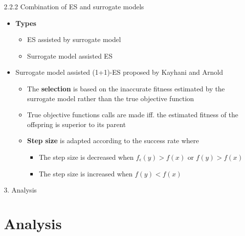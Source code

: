 \documentclass{beamer}
\begin{document}
\begin{frame}{2.2.2 Combination of ES and surrogate models}

\begin{itemize}
    \item \textbf{Types} 
    \begin{itemize}
        \item ES assisted by surrogate model
        \item Surrogate model assisted ES
    \end{itemize}
    
    
    \item Surrogate model assisted (1+1)-ES proposed by Kayhani and Arnold 
    \begin{itemize}
        \item The \textbf{selection} is based on the inaccurate fitness estimated by the surrogate model rather than the true objective function
        \item True objective functions calls are made iff. the estimated fitness of the offspring is superior to its parent
        \item \textbf{Step size} is adapted according to the success rate where 
            \begin{itemize}
                \item The step size is decreased when $f_\epsilon(y)>f(x)$ or $f(y)>f(x)$
                \item The step size is increased when $f(y)<f(x)$
            \end{itemize}
    \end{itemize}
\end{itemize}
\end{frame}



\begin{frame}[plain,c]
\begin{center}
\Huge 3. Analysis
\end{center}
\end{frame}
\section{Analysis}
\end{document}
